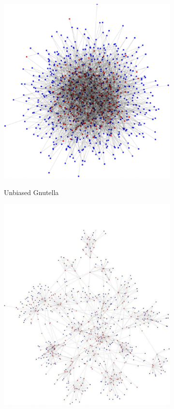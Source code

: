 \begin{figure}[tbp]
   \begin{subfigure}[]{0.4\linewidth}
     {\includegraphics[angle=-90,width=1\linewidth]{figures/snapshot_nond.eps}}
   \caption{Unbiased Gnutella}%
   \end{subfigure}
\hfill
   \begin{subfigure}[]{0.45\linewidth}
     {\includegraphics[angle=-90,width=1\linewidth]{figures/snapshot_nd.eps}}

\end{subfigure}
\end{figure}
